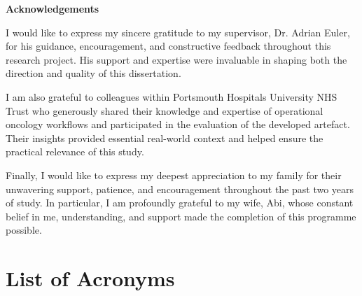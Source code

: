 \documentclass[12pt, a4paper, twoside]{report}
\begin{document}
\clearpage 
{} 
{} 
\vspace*{\fill} 
\begin{center} 
    {\bfseries Acknowledgements} 
\end{center} 
\vspace{0.8cm} 

I would like to express my sincere gratitude to my supervisor, Dr. Adrian Euler, for his guidance, encouragement, and constructive feedback throughout this research project. His support and expertise were invaluable in shaping both the direction and quality of this dissertation. 

I am also grateful to colleagues within Portsmouth Hospitals University NHS Trust who generously shared their knowledge and expertise of operational oncology workflows and participated in the evaluation of the developed artefact. Their insights provided essential real-world context and helped ensure the practical relevance of this study. 

Finally, I would like to express my deepest appreciation to my family for their unwavering support, patience, and encouragement throughout the past two years of study. In particular, I am profoundly grateful to my wife, Abi, whose constant belief in me, understanding, and support made the completion of this programme possible. 
\vspace*{\fill} 
\clearpage


\setcounter{tocdepth}{1}
\tableofcontents
\clearpage
{}
\listoffigures
\clearpage
{}
\listoftables
\clearpage
\chapter*{List of Acronyms}


\cleardoublepage
{}







\clearpage
{}


\clearpage

\appendix




\end{document}
